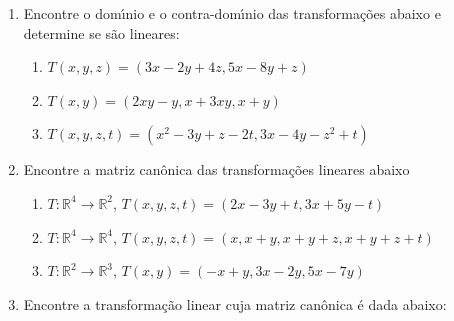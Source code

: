 \documentclass[a4paper,5pt]{amsbook}
\begin{document}
\vspace{1cm}
\begin{enumerate}
	\vspace{0.5cm}
	\item Encontre o dom\'{\i}nio e o contra-dom\'{\i}nio das transforma\c{c}\~oes abaixo e
		determine se s\~ao lineares:
		\begin{enumerate}
			\item $T(x,y,z) = (3x-2y+4z, 5x-8y+z)$
			\item $T(x,y) = (2xy-y, x+3xy, x+y)$
			\item $T(x,y,z,t) = (x^2-3y+z-2t, 3x-4y-z^2+t)$
		\end{enumerate}

	\vspace{0.5cm}
	\item Encontre a matriz can\^onica das transforma\c{c}\~oes lineares abaixo
		\begin{enumerate}
			\item $T: \mathbb{R}^4 \rightarrow \mathbb{R}^2$, $T(x,y,z,t) =
                (2x-3y+t, 3x+5y-t)$
			\item $T: \mathbb{R}^4 \rightarrow \mathbb{R}^4$, $T(x,y,z,t) = (x,
				x+y, x+y+z, x+y+z+t)$
			\item $T: \mathbb{R}^2 \rightarrow \mathbb{R}^3$, $T(x,y) = (-x+y,
				3x-2y, 5x-7y)$
		\end{enumerate}

	\vspace{0.5cm}
	\item Encontre a transforma\c{c}\~ao linear cuja matriz can\^onica \'e dada abaixo:



\end{enumerate}
\end{document}
